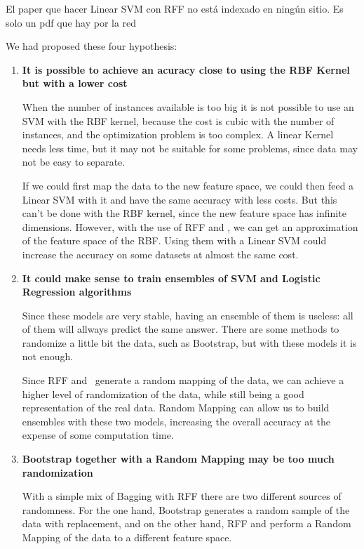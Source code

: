 \begin{tcolorbox}[breakable, colback=red,coltext=black]
  El paper que hacer Linear SVM con RFF no está indexado en ningún sitio. Es
  solo un pdf que hay por la red
\end{tcolorbox}
\begin{pre-delivery}
  We had proposed these four hypothesis:
  \begin{enumerate}
    \item \textbf{It is possible to achieve an acuracy close to using the
    RBF Kernel but with a lower cost}

    When the number of instances available is too big it is not possible to
    use an SVM with the RBF kernel, because the cost is cubic with the
    number of instances, and the optimization problem is too complex. A linear
    Kernel needs less time, but it may not be suitable for some problems,
    since data may not be easy to separate.

    If we could first map the data to the new feature space, we could then feed
    a Linear SVM with it and have the same accuracy with less costs. But this
    can't be done with the RBF kernel, since the new feature space has infinite
    dimensions. However, with the use of RFF and \Nys, we can get an approximation
    of the feature space of the RBF. Using them with a Linear SVM could
    increase the accuracy on some datasets at almost the same cost.

    \item \textbf{It could make sense to train ensembles of SVM and Logistic
    Regression algorithms}

    Since these models are very stable, having an ensemble of them is useless:
    all of them will allways predict the same answer. There are some
    methods to randomize a little bit the data, such as Bootstrap, but with
    these models it is not enough.

    Since RFF and \Nys\ generate a random mapping of the data, we can achieve
    a higher level of randomization of the data, while still being a good
    representation of the real data. Random Mapping can allow us to build
    ensembles with these two models, increasing the overall accuracy at the
    expense of some computation time.

    \item \textbf{Bootstrap together with a Random Mapping may be too much
    randomization}

    With a simple mix of Bagging with RFF there are two different sources
    of randomness. For the one hand, Bootstrap generates a random sample of
    the data with replacement, and on the other hand, RFF and \Nys perform
    a Random Mapping of the data to a different feature space.


\end{enumerate}
\end{pre-delivery}
